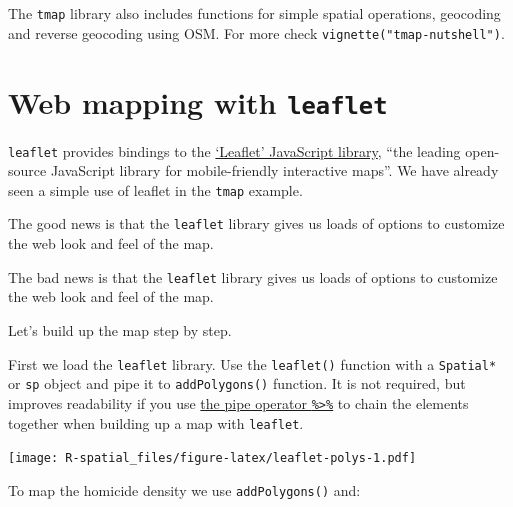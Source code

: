 \documentclass[]{book}
\newenvironment{Shaded}{\begin{snugshade}}{\end{snugshade}}
\newcommand{\KeywordTok}[1]{\textcolor[rgb]{0.13,0.29,0.53}{\textbf{#1}}}
\newcommand{\StringTok}[1]{\textcolor[rgb]{0.31,0.60,0.02}{#1}}
\newcommand{\OperatorTok}[1]{\textcolor[rgb]{0.81,0.36,0.00}{\textbf{#1}}}
\newcommand{\NormalTok}[1]{#1}
\theoremstyle{definition}
\theoremstyle{definition}
\theoremstyle{definition}
\theoremstyle{remark}
\begin{document}
The \texttt{tmap} library also includes functions for simple spatial
operations, geocoding and reverse geocoding using OSM. For more check
\texttt{vignette("tmap-nutshell")}.

\section{\texorpdfstring{Web mapping with
\texttt{leaflet}}{Web mapping with leaflet}}\label{web-mapping-with-leaflet}

\texttt{leaflet} provides bindings to the
\href{http://leafletjs.com}{`Leaflet' JavaScript library}, ``the leading
open-source JavaScript library for mobile-friendly interactive maps''.
We have already seen a simple use of leaflet in the \texttt{tmap}
example.

The good news is that the \texttt{leaflet} library gives us loads of
options to customize the web look and feel of the map.

The bad news is that the \texttt{leaflet} library gives us loads of
options to customize the web look and feel of the map.

Let's build up the map step by step.

First we load the \texttt{leaflet} library. Use the \texttt{leaflet()}
function with a \texttt{Spatial*} or \texttt{sp} object and pipe it to
\texttt{addPolygons()} function. It is not required, but improves
readability if you use \href{https://github.com/tidyverse/magrittr}{the
pipe operator \texttt{\%\textgreater{}\%}} to chain the elements
together when building up a map with \texttt{leaflet}.

\begin{Shaded}
\end{Shaded}

\texttt{[image: R-spatial\_files/figure-latex/leaflet-polys-1.pdf]}

To map the homicide density we use \texttt{addPolygons()} and:
\end{document}

